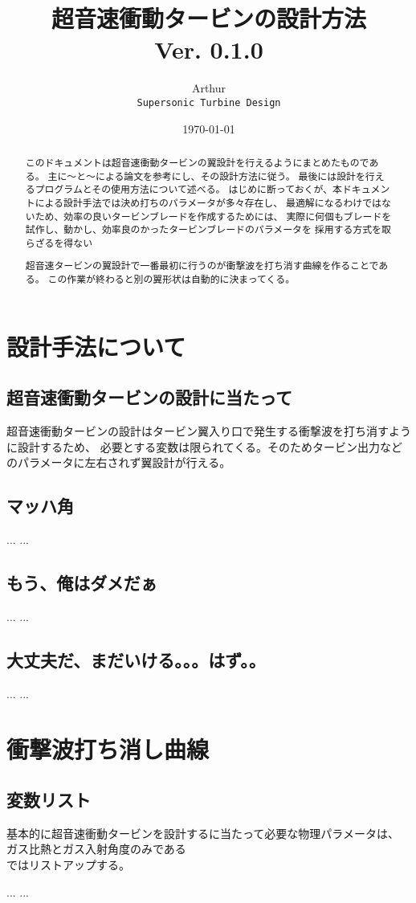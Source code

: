 \documentclass[a4j,10pt,oneside,openany]{jsbook}
\title{{\Huge \textbf{超音速衝動タービンの設計方法}}\\ {\small Ver. 0.1.0}}
\author{Arthur\\ \texttt{Supersonic Turbine Design}}
\date{\today}
\begin{document}
%
%
\maketitle
\frontmatter
\tableofcontents
%
%
\mainmatter

\chapter{設計手法について}
\begin{abstract}

このドキュメントは超音速衝動タービンの翼設計を行えるようにまとめたものである。
主に〜と〜による論文を参考にし、その設計方法に従う。
最後には設計を行えるプログラムとその使用方法について述べる。
はじめに断っておくが、本ドキュメントによる設計手法では決め打ちのパラメータが多々存在し、
最適解になるわけではないため、効率の良いタービンブレードを作成するためには、
実際に何個もブレードを試作し、動かし、効率良のかったタービンブレードのパラメータを
採用する方式を取らざるを得ない

\end{abstract}

\section{超音速衝動タービンの設計に当たって}
超音速衝動タービンの設計はタービン翼入り口で発生する衝撃波を打ち消すように設計するため、
必要とする変数は限られてくる。そのためタービン出力などのパラメータに左右されず翼設計が行える。

\section{マッハ角}
...
...

\section{もう、俺はダメだぁ}
...
...

\section{大丈夫だ、まだいける。。。はず。。}
...
...

\chapter{衝撃波打ち消し曲線}
\begin{abstract}
超音速タービンの翼設計で一番最初に行うのが衝撃波を打ち消す曲線を作ることである。
この作業が終わると別の翼形状は自動的に決まってくる。
\end{abstract}

\section{変数リスト}
基本的に超音速衝動タービンを設計するに当たって必要な物理パラメータは、
ガス比熱とガス入射角度のみである\\

ではリストアップする。

\begin{thebibliography}{20}
...
...
\end{thebibliography}

\newpage
\printindex
%
%
\end{document}
